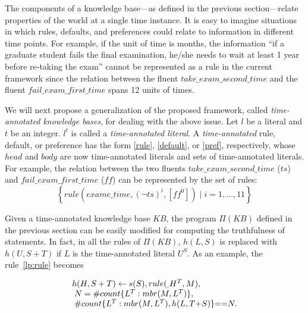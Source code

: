 \documentclass{article}
\begin{document}
The components of a knowledge base---as defined in the previous section---relate properties of the world at a single time instance. It is easy to imagine situations in which rules, defaults, and preferences could relate to information in different time points. For example, if the unit of time is months, the information ``if a graduate student fails the final examination, he/she needs to wait at least 1 year before re-taking the exam'' cannot be represented as a rule in the current framework since the relation between the fluent $take\_exam\_second\_time$ and the fluent $fail\_exam\_first\_time$  spans 12 units of times. 

We will next propose a generalization of the proposed framework, called 
\emph{time-annotated knowledge bases}, for dealing with the above issue. Let $l$ be a literal and $t$ be an integer. $l^t$ is called a \emph{time-annotated literal}. A \emph{time-annotated} rule, default, or preference has the form \eqref{rule}, \eqref{default}, or \eqref{pref}, respectively, whose $head$ and $body$ are now time-annotated literals and sets of time-annotated literals. For example, the relation between the two fluents $take\_exam\_second\_time$ ($ts$) and $fail\_exam\_first\_time$ ($ff$) can be represented by the set of rules: 
$$
\left \{ 
rule(exame\_time, (\neg ts)^i,  [ff^0])  
\mid i=1,\ldots,11 
\right\}
$$
 
Given a time-annotated knowledge base $KB$, the program $\Pi(KB)$ defined in the previous section can be easily modified for computing the truthfulness of statements. In fact, in all the rules of $\Pi(KB)$, $h(L, S)$ is replaced with $h(U, S+T)$ if $L$ is the time-annotated literal $U^S$. As an example, the rule~\eqref{lp:rule} becomes 

  \begin{equation}\label{lp:rule:tt}
\begin{array}{l}
h(H, S+T) \leftarrow  s(S),  
        rule(_, H^T, M),  \\ 
     \hspace{.1cm} N = \# count \{L^T : mbr(M, L^T)\},  \\ 
    \hspace{.1cm}  \# count \{L^T : mbr(M, L^T),  h(L, T{+}S) \} {==} N. 
      \end{array}
\end{equation} 


 
\end{document}
